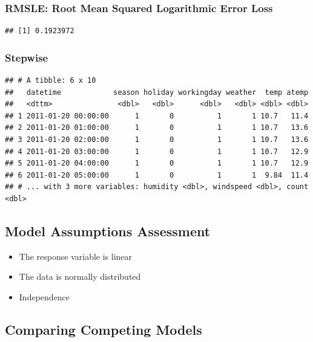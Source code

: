 \documentclass[american,]{article}
\providecommand{\tightlist}{%
  \setlength{\itemsep}{0pt}\setlength{\parskip}{0pt}}
\begin{document}
\hypertarget{rmsle-root-mean-squared-logarithmic-error-loss}{%
\subsubsection{RMSLE: Root Mean Squared Logarithmic Error Loss}\label{rmsle-root-mean-squared-logarithmic-error-loss}}

\begin{verbatim}
## [1] 0.1923972
\end{verbatim}

\hypertarget{stepwise}{%
\subsubsection{Stepwise}\label{stepwise}}

\begin{verbatim}
## # A tibble: 6 x 10
##   datetime            season holiday workingday weather  temp atemp
##   <dttm>               <dbl>   <dbl>      <dbl>   <dbl> <dbl> <dbl>
## 1 2011-01-20 00:00:00      1       0          1       1 10.7   11.4
## 2 2011-01-20 01:00:00      1       0          1       1 10.7   13.6
## 3 2011-01-20 02:00:00      1       0          1       1 10.7   13.6
## 4 2011-01-20 03:00:00      1       0          1       1 10.7   12.9
## 5 2011-01-20 04:00:00      1       0          1       1 10.7   12.9
## 6 2011-01-20 05:00:00      1       0          1       1  9.84  11.4
## # ... with 3 more variables: humidity <dbl>, windspeed <dbl>, count <dbl>
\end{verbatim}

\newpage

\hypertarget{model-assumptions-assessment}{%
\subsection{Model Assumptions Assessment}\label{model-assumptions-assessment}}

\begin{itemize}
\tightlist
\item
  The response variable is linear
\item
  The data is normally distributed
\item
  Independence
\end{itemize}

\hypertarget{comparing-competing-models}{%
\subsection{Comparing Competing Models}\label{comparing-competing-models}}
\end{document}

